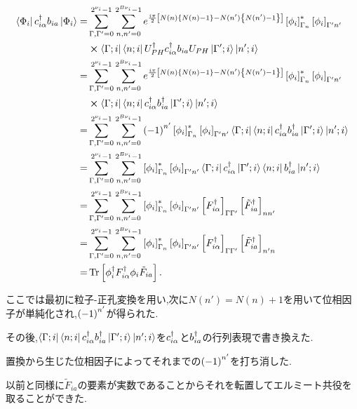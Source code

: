 \begin{equation}
\begin{split}
    \Bra{\Phi_{i}}c^\dagger_{i\alpha}b_{ia}\Ket{\Phi_{i}}=&\sum_{\Gamma,\Gamma'=0}^{2^{\nu_{i}}-1}\sum_{n,n'=0}^{2^{B\nu_{i}}-1}e^{\frac{i\pi}{2}\left[ N(n)\left \{ N(n)-1 \right\}-N(n')\left \{ N(n')-1 \right\} \right]}\left[ \phi_{i} \right]^*_{\Gamma_{n}}\left[ \phi_{i} \right]_{\Gamma'n'}\\
    &\cross \Bra{\Gamma;i}\Bra{n;i}U^\dagger_{PH}c^\dagger_{i\alpha}b_{ia}U_{PH}\Ket{\Gamma';i}\Ket{n';i}\\
    =&\sum_{\Gamma,\Gamma'=0}^{2^{\nu_{i}}-1}\sum_{n,n'=0}^{2^{B\nu_{i}}-1}e^{\frac{i\pi}{2}\left[ N(n)\left \{ N(n)-1 \right\}-N(n')\left \{ N(n')-1 \right\} \right]}\left[ \phi_{i} \right]^*_{\Gamma_{n}}\left[ \phi_{i} \right]_{\Gamma'n'}\\
    &\cross \Bra{\Gamma;i}\Bra{n;i}c^\dagger_{i\alpha}b^\dagger_{ia}\Ket{\Gamma';i}\Ket{n';i}\\
    =&\sum_{\Gamma,\Gamma'=0}^{2^{\nu_{i}}-1}\sum_{n,n'=0}^{2^{B\nu_{i}}-1}\left( -1 \right)^{n'}\left[ \phi_{i} \right]^*_{\Gamma_{n}}\left[ \phi_{i} \right]_{\Gamma'n'}\Bra{\Gamma;i}\Bra{n;i}c^\dagger_{i\alpha}b^\dagger_{ia}\Ket{\Gamma';i}\Ket{n';i}\\
    =&\sum_{\Gamma,\Gamma'=0}^{2^{\nu_{i}}-1}\sum_{n,n'=0}^{2^{B\nu_{i}}-1}\left[ \phi_{i} \right]^*_{\Gamma_{n}}\left[ \phi_{i} \right]_{\Gamma'n'}\Bra{\Gamma;i}c^\dagger_{i\alpha}\Ket{\Gamma';i}\Bra{n;i}b^\dagger_{ia}\Ket{n';i}\\
    =&\sum_{\Gamma,\Gamma'=0}^{2^{\nu_{i}}-1}\sum_{n,n'=0}^{2^{B\nu_{i}}-1}\left[ \phi_{i} \right]^*_{\Gamma_{n}}\left[ \phi_{i} \right]_{\Gamma'n'}\left[ F^\dagger_{i\alpha} \right]_{\Gamma\Gamma'}\left[ \tilde{F}^\dagger_{ia} \right]_{nn'}\\
    =&\sum_{\Gamma,\Gamma'=0}^{2^{\nu_{i}}-1}\sum_{n,n'=0}^{2^{B\nu_{i}}-1}\left[ \phi_{i} \right]^*_{\Gamma_{n}}\left[ \phi_{i} \right]_{\Gamma'n'}\left[ F^\dagger_{i\alpha} \right]_{\Gamma\Gamma'}\left[ \tilde{F}^\dagger_{ia} \right]_{n'n}\\
    =&\Tr \left[ \phi ^\dagger_{i}F^\dagger_{i\alpha}\phi_{i}\tilde{F}_{ia} \right].
\end{split}
\end{equation}

ここでは最初に粒子-正孔変換を用い,次に$N(n')=N(n)+1$を用いて位相因子が単純化され,$\left( -1 \right)^{n'}$が得られた.

その後,$\Bra{\Gamma;i}\Bra{n;i}c^\dagger_{i\alpha }b^\dagger_{ia}\Ket{\Gamma';i}\Ket{n';i}$を$c^\dagger_{i\alpha}$と$b^\dagger_{ia}$の行列表現で書き換えた.

置換から生じた位相因子によってそれまでの$\left( -1 \right)^{n'}$を打ち消した.

以前と同様に$\tilde{F}_{ia}$の要素が実数であることからそれを転置してエルミート共役を取ることができた.

